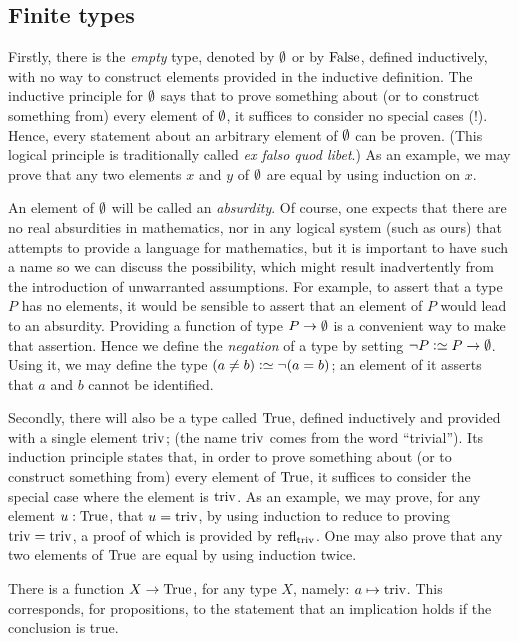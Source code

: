 \subsection{Finite types}
\label{sec:finite-types}
Firstly, there is the {\em empty} type, denoted by $\emptyset$ or by $\mathrm{False}$, defined inductively, with no way to construct elements provided in the inductive
definition.  The inductive principle for $\emptyset$ says that to prove something about (or to construct something from) every element of
$\emptyset$, it suffices to consider no special cases (!).  Hence, every statement about an arbitrary element of $\emptyset$ can be proven. (This logical principle is traditionally called {\em ex falso quod libet}.) As
an example, we may prove that any two elements $x$ and $y$ of $\emptyset$ are equal by using induction on $x$.

An element of $\emptyset$ will be called an \emph{absurdity}.  Of course, one expects that there are no real absurdities in mathematics, nor in any
logical system (such as ours) that attempts to provide a language for mathematics, but it is important to have such a name so we can discuss
the possibility, which might result inadvertently from the introduction of unwarranted assumptions.  For example, to assert that a type $P$ has
no elements, it would be sensible to assert that an element of $P$ would lead to an absurdity.  Providing a function of type $P \to \emptyset$ is a
convenient way to make that assertion.  Hence we define the {\em negation} of a type by setting $\neg P \defeq P \to \emptytype$.  Using it, we
may define the type $(a \ne b) \defeq \neg (a = b)$; an element of it asserts that $a$ and $b$ cannot be identified.

Secondly, there will also be a type called $\mathrm{True}$, defined inductively and provided with a single element $\mathrm{triv}$; (the name $\mathrm{triv}$ comes from the word
  ``trivial'').  Its induction principle
states that, in order to prove something about (or to construct something from) every element of $\mathrm{True}$, it suffices to consider the special
case where the element is $\mathrm{triv}$.  As an example, we may prove, for any element $u : \mathrm{True}$, that $u=\mathrm{triv}$, by using induction to reduce
to proving $\mathrm{triv}=\mathrm{triv}$, a proof of which is provided by $\refl{\triv}$.  One may also prove that any two elements of $\mathrm{True}$ are equal by using induction twice.

There is a function $X \to \mathrm{True}$, for any type $X$, namely: $a \mapsto \mathrm{triv}$.  This corresponds, for propositions, to the statement that an
implication holds if the conclusion is true.

